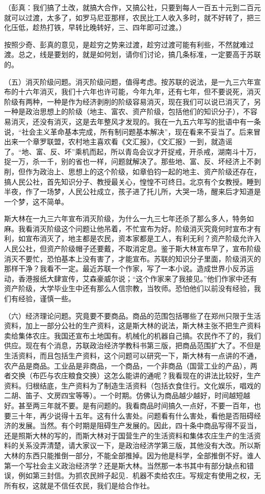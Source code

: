 （彭真：我们搞了土改，就搞大合作，又搞公社，只要到每人一百五十元到二百元就可以过渡，太多了，如罗马尼亚那样，农民比工人收入多时，就不好转了，把三化压低，趁热打铁，早转比晚转好，三、四年即可过渡。）

按照少奇、彭真的意见，是趁穷之势来过渡，趁穷过渡可能有利些，不然就难过渡。总之，线是要划的，就是如何划，请你们讨论，搞几条标准，一定要高于苏联的。

（五）消灭阶级问题。消灭阶级问题，值得考虑。按苏联的说法，是一九三六年宣布的十六年消灭，我们十六年也许可能，今年九年，还有七年，但不要说死，消灭阶级有两种，一种是作为经济剥削的阶级容易消灭，现在我们可以说已消灭了，另一种是政治思想上的阶级（地主、富农、资产阶级，包括他们的知识分子），不容易消灭，还没有消灭，这是去年整风才发现的。我在一九五六年写的批语中有一条说，“社会主义革命基本完成，所有制问题基本解决”，现在看来不妥当了。后来冒出来一个章罗联盟，农村地主喜欢看《文汇报》，《文汇报》一到，就造谣了。“地、富、反、坏”乘机而起，所以青岛会议才开捉戒，开杀戒，湖南斗十万，捉一万，杀一千，别的省也一样，问题就解决了。那些地、富、反、坏经济上不剥削，但作为政治上、思想上的这个阶级，如章伯钧一起的地主、资产阶级还存在，搞人民公社，首先知识分子、教授最关心，惶惶不可终日。北京有个女教授。睡到半夜，作了一场梦，人民公社成立，孩子进了托儿所，大哭一场，醒来后才知道是一个梦，这不简单。

斯大林在一九三六年宣布消灭阶级，为什么一九三七年还杀了那么多人，特务如麻。我看消灭阶级这个问题让他吊着，不忙宣布为好。阶级消灭究竟何时宣布才有利，如宣布消灭了，地主都是农民，资本家都是工人，有利无利？资产阶级允许入人民公社，但资产阶级帽子还要戴，不取消定息。鉴于斯大林宣布早了，宣布阶级消灭不要忙，恐怕基本上没有害了，才能宣布。苏联的知识分子里面，阶级消灭的那样干净？我看不一定。最近苏联一个作家，写了一本小说。造成世界小反苏运动，香港报纸大肆宣传，艾森豪威尔说；“这个作家来了我接见。”他们作家中还有资产阶级，大学毕业生中还有那么人信宗教，当牧师。恐怕他们以前没有经验，我们有经验，谨慎一些。

（六）经济理论问题。究竟要不要商品。商品的范围包括哪些了在郑州只限于生活资料，加上一部分公社的生产资料，这是斯大林的说法，斯大林主张不把生产资料卖给集体农庄。我国还宣布土地国有。机械化的机器自己搞。农民作不了的，我们供应。现在有个消息，苏联政治经济学教科书第三版，把商品范围扩大了。不但是生活资料，而且包括生产资料，这个问题可以研究一下，斯大林有一点讲的不通，农产品是商品。工业品是非商品，一个商品，一个非商品（国营工业的产品），两者交换（布匹与农庄粮食交换）这怎么能讲的通呢？我看现在的讲法比较好，生产资料。归根结底，生产资料为了制造生活资料（包括衣食住行。文化娱乐，唱戏的二胡、笛子、文房四宝等等）。一个时期。仿佛认为商品越少越好，时间越短越好。甚至两三年就不要。是有问题的。我看商品时间搞久一点好，不要一百年，也要三十年，再少说得十五年。这有什么害处。问题看有什么害处，看他是否阻碍经济的发展。当然。有个时期是阻碍生产发展的。因此，四十条中商品写得不妥当，还是照斯大林的写的，而斯大林对于国营生产的生活资料和集体农庄生产的生活资料的关系没弄清楚，请大家议一下，是政治经济学第三版，其他没有大改。所以斯大林的东西只能推倒一部分，不能全部推掉。因为他是科学，全部推倒不好。谁人第一个写社会主义政治经济学？还是斯大林。当然那一本书其中有部分缺点和错误，例如第三封信。为抓农民辫子起见．机器不卖给农庄。写规定有使用之权，无所有权，这就是不信任农民，我们是给合作社。

